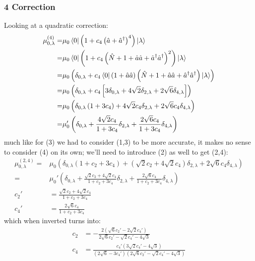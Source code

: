 \subsubsection{4  Correction}
Looking at a quadratic correction:
\begin{align*}
	\mu^{(4)}_{0,\lambda} =& \mu_0 \bra{0} \left( 1 + c_4\left(\hat{a} + \hat{a}^{\dagger}\right)^4\right) \ket{\lambda}\\
	=& \mu_0 \bra{0} \left( 1 + c_4 \left(\hat{N} + 1 + \hat{a}\hat{a} + \hat{a}^{\dagger}\hat{a}^{\dagger}\right)^2 \right) \ket{\lambda} \\
	=& \mu_0  \left( \delta_{0, \lambda} + c_4 \bra{0} \left(1 + \hat{a}\hat{a}\right)\left(\hat{N} + 1 + \hat{a}\hat{a} + \hat{a}^{\dagger}\hat{a}^{\dagger}\right) \ket{\lambda}\right)  \\
	=& \mu_0  \left( \delta_{0, \lambda} + c_4\left[ 3 \delta_{0, \lambda} + 4\sqrt{2}\delta_{2, \lambda}  + 2\sqrt{6}\delta_{4, \lambda}  \right]\right)  \\
	=& \mu_0  \left( \delta_{0, \lambda} \left( 1 + 3c_4 \right) + 4\sqrt{2}c_4\delta_{2, \lambda}  + 2\sqrt{6}c_4\delta_{4, \lambda}\right)\\
	=& \mu_0'  \left( \delta_{0, \lambda}  + \frac{4\sqrt{2}c_4}{1 + 3c_4 }\delta_{2, \lambda}  + \frac{2\sqrt{6}c_4}{1 + 3c_4 }\delta_{4, \lambda}\right)
\end{align*}
much like for (3) we had to consider (1,3) to be more accurate, it makes no sense to consider (4) on its own; we'll need to introduce (2) as well to get (2,4):
\begin{align*}
	\mu^{(2,4)}_{0,\lambda} =& \mu_0  \left( \delta_{0, \lambda} \left( 1 + c_2 + 3c_4 \right) + \left( \sqrt{2} c_2 + 4\sqrt{2}c_4 \right)\delta_{2, \lambda}  + 2\sqrt{6}c_4\delta_{4, \lambda}\right)\\
	=& \mu_0'  \left( \delta_{0, \lambda} + \frac{\sqrt{2} c_2 + 4\sqrt{2}c_4 }{1 + c_2 + 3c_4 }\delta_{2, \lambda}  + \frac{2\sqrt{6}c_4}{1 + c_2 + 3c_4 }\delta_{4, \lambda}\right) \\
	c_2' &= \frac{\sqrt{2} c_2 + 4\sqrt{2}c_4 }{1 + c_2 + 3c_4 } \\
	c_4' &= \frac{2\sqrt{6}c_4}{1 + c_2 + 3c_4 }
\end{align*}
which when inverted turns into:
\begin{align*}
	c_2 &= -\frac{2 \left(\sqrt{6} c_2'-2 \sqrt{2} c_4'\right)}{2 \sqrt{6} c_2'-\sqrt{2} c_4'-4 \sqrt{3}}\\
	c_4 &= \frac{c_4' \left(3 \sqrt{2} c_4'-4 \sqrt{3}\right)}{\left(2 \sqrt{6}-3 c_4'\right) \left(2 \sqrt{6} c_2'-\sqrt{2} c_4'-4 \sqrt{3}\right)}
\end{align*}


